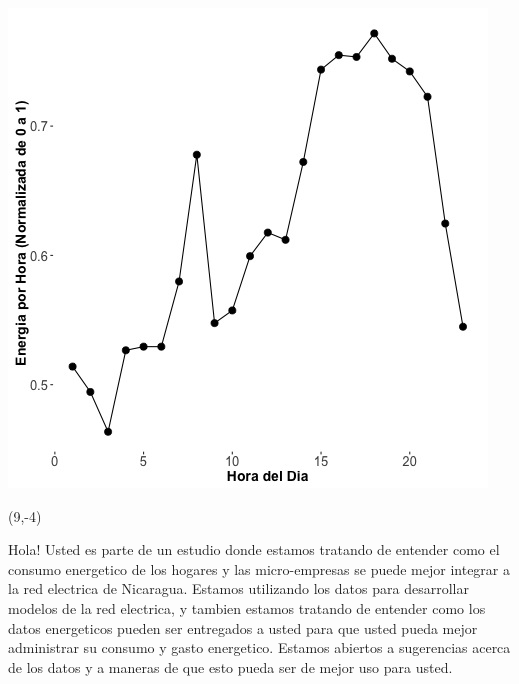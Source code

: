 \documentclass{article}\usepackage[]{graphicx}\usepackage[]{color}
\newenvironment{knitrout}{}{} %
\begin{document}
\begin{knitrout}
\color{fgcolor}
\includegraphics[scale=0.75]{figure/A8_fplot_norm_median} 
\end{knitrout}

 \begin{textblock}{1}(9,-4)
\begin{minipage}{20em}
\begingroup

\endgroup
\end{minipage}
\end{textblock}

\vspace{70px}
\begin{knitrout}
Hola! Usted es parte de un estudio donde estamos tratando de entender como el consumo energetico de los hogares y las micro-empresas se puede mejor integrar a la red electrica de Nicaragua. Estamos utilizando los datos para desarrollar modelos de la red electrica, y tambien estamos tratando de entender como los datos energeticos pueden ser entregados a usted para que usted pueda mejor administrar su consumo y gasto energetico.  Estamos abiertos a sugerencias acerca de los datos y a maneras de que esto pueda ser de mejor uso para usted.
\end{knitrout}
\end{document}

